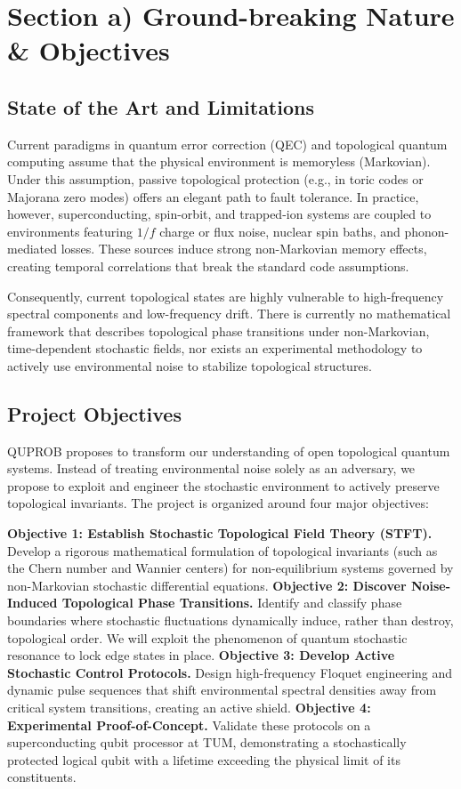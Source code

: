 \section{Section a) Ground-breaking Nature \& Objectives}

\subsection{State of the Art and Limitations}
Current paradigms in quantum error correction (QEC) and topological quantum computing assume that the physical environment is memoryless (Markovian). Under this assumption, passive topological protection (e.g., in toric codes or Majorana zero modes) offers an elegant path to fault tolerance. In practice, however, superconducting, spin-orbit, and trapped-ion systems are coupled to environments featuring $1/f$ charge or flux noise, nuclear spin baths, and phonon-mediated losses. These sources induce strong non-Markovian memory effects, creating temporal correlations that break the standard code assumptions. 

\pbreak
Consequently, current topological states are highly vulnerable to high-frequency spectral components and low-frequency drift. There is currently no mathematical framework that describes topological phase transitions under non-Markovian, time-dependent stochastic fields, nor exists an experimental methodology to actively use environmental noise to stabilize topological structures.

\subsection{Project Objectives}
QUPROB proposes to transform our understanding of open topological quantum systems. Instead of treating environmental noise solely as an adversary, we propose to exploit and engineer the stochastic environment to actively preserve topological invariants. The project is organized around four major objectives:

\pbreak
\textbf{Objective 1: Establish Stochastic Topological Field Theory (STFT).} 
Develop a rigorous mathematical formulation of topological invariants (such as the Chern number and Wannier centers) for non-equilibrium systems governed by non-Markovian stochastic differential equations.
\pbreak
\textbf{Objective 2: Discover Noise-Induced Topological Phase Transitions.}
Identify and classify phase boundaries where stochastic fluctuations dynamically induce, rather than destroy, topological order. We will exploit the phenomenon of quantum stochastic resonance to lock edge states in place.
\pbreak
\textbf{Objective 3: Develop Active Stochastic Control Protocols.}
Design high-frequency Floquet engineering and dynamic pulse sequences that shift environmental spectral densities away from critical system transitions, creating an active shield.
\pbreak
\textbf{Objective 4: Experimental Proof-of-Concept.}
Validate these protocols on a superconducting qubit processor at TUM, demonstrating a stochastically protected logical qubit with a lifetime exceeding the physical limit of its constituents.

\vspace{1.5em}
